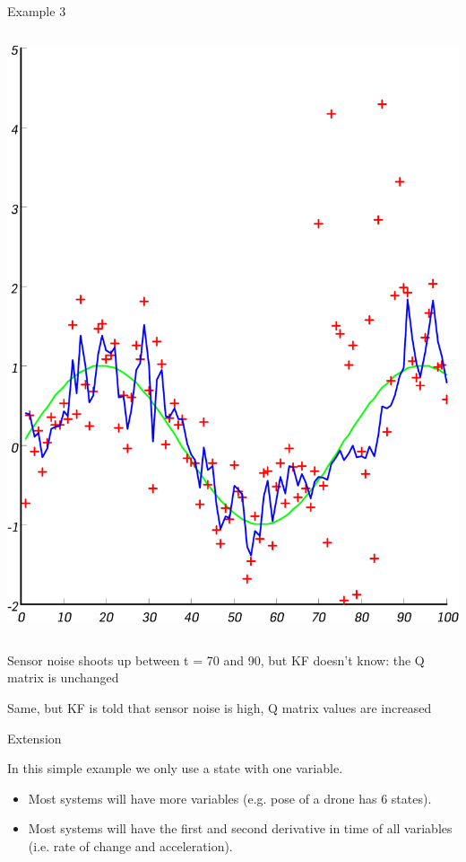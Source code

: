 \documentclass[compress]{beamer}
\begin{document}
\begin{frame}{Example 3}
\begin{columns}
\begin{column}{0.5\linewidth}
\begin{center}
                \includegraphics[width=0.8\linewidth]{kalman4}
            \end{center}
        \end{column}
    \end{columns}


Sensor noise shoots up between t = 70 and 90, but KF doesn't know: the Q
matrix is unchanged

Same, but KF is told that sensor noise is high, Q matrix values are
increased

\end{frame}

\begin{frame}{Extension}

In this simple example we only use a state with one variable.

\begin{itemize}
    \item Most systems will have more variables (e.g. pose of a drone has 6
  states).
    \item Most systems will have the first and second derivative in time of all
  variables (i.e. rate of change and acceleration).
\end{itemize}

\end{frame}
\end{document}

